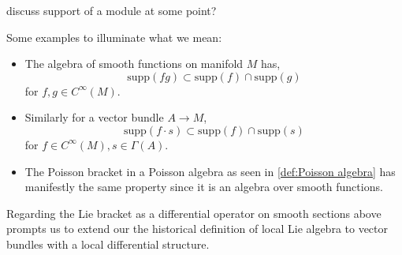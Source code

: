 \begin{tcolorbox}
    discuss support of a module at some point?
\end{tcolorbox}
\label{def:locality}
% 
Some examples to illuminate what we mean:
\begin{itemize}
    \item The algebra of smooth functions on manifold $M$ has,
    \begin{equation*}
        \mathrm{supp}(fg) \subset \mathrm{supp}(f) \cap \mathrm{supp}(g)
    \end{equation*}
    for $f,g \in C^\infty(M)$.
    \item Similarly for a vector bundle $A \rightarrow M$,
    \begin{equation*}
        \mathrm{supp}(f \cdot s  ) \subset \mathrm{supp}(f) \cap \mathrm{supp}(s)
    \end{equation*}
    for $f \in C^\infty(M), s \in \Gamma(A)$.
    \item The Poisson bracket in a Poisson algebra as seen in \cref{def:Poisson algebra} has manifestly the same property since it is an algebra over smooth functions.
\end{itemize}
% 
\label{def:local lie algebra-historical}
% 
Regarding the Lie bracket as a differential operator on smooth sections above prompts us to extend our the historical definition of local Lie algebra to vector bundles with a local differential structure.
% 
\label{def:local lie algebra-differential}
